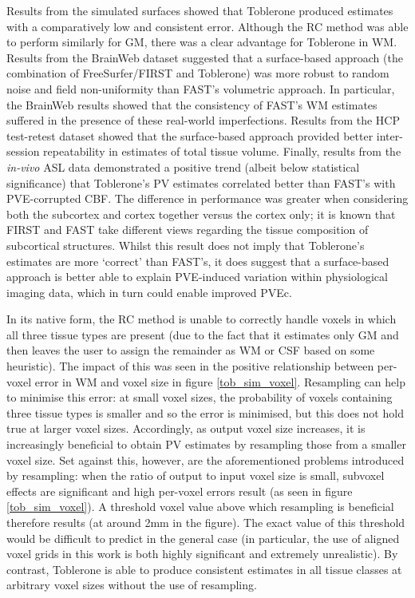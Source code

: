 Results from the simulated surfaces showed that Toblerone produced estimates with a comparatively low and consistent error. Although the RC method was able to perform similarly for GM, there was a clear advantage for Toblerone in WM. Results from the BrainWeb dataset suggested that a surface-based approach (the combination of FreeSurfer/FIRST and Toblerone) was more robust to random noise and field non-uniformity than FAST’s volumetric approach. In particular, the BrainWeb results showed that the consistency of FAST’s WM estimates suffered in the presence of these real-world imperfections. Results from the HCP test-retest dataset showed that the surface-based approach provided better inter-session repeatability in estimates of total tissue volume. Finally, results from the \textit{in-vivo} ASL data demonstrated a positive trend (albeit below statistical significance) that Toblerone's PV estimates correlated better than FAST's with PVE-corrupted CBF. The difference in performance was greater when considering both the subcortex and cortex together versus the cortex only; it is known that FIRST and FAST take different views regarding the tissue composition of subcortical structures. Whilst this result does not imply that Toblerone's estimates are more `correct' than FAST's, it does suggest that a surface-based approach is better able to explain PVE-induced variation within physiological imaging data, which in turn could enable improved PVEc. 

In its native form, the RC method is unable to correctly handle voxels in which all three tissue types are present (due to the fact that it estimates only GM and then leaves the user to assign the remainder as WM or CSF based on some heuristic). The impact of this was seen in the positive relationship between per-voxel error in WM and voxel size in figure \ref{tob_sim_voxel}. Resampling can help to minimise this error: at small voxel sizes, the probability of voxels containing three tissue types is smaller and so the error is minimised, but this does not hold true at larger voxel sizes. Accordingly, as output voxel size increases, it is increasingly beneficial to obtain PV estimates by resampling those from a smaller voxel size. Set against this, however, are the aforementioned problems introduced by resampling: when the ratio of output to input voxel size is small, subvoxel effects are significant and high per-voxel errors result (as seen in figure \ref{tob_sim_voxel}). A threshold voxel value above which resampling is beneficial therefore results (at around 2mm in the figure). The exact value of this threshold would be difficult to predict in the general case (in particular, the use of aligned voxel grids in this work is both highly significant and extremely unrealistic). By contrast, Toblerone is able to produce consistent estimates in all tissue classes at arbitrary voxel sizes without the use of resampling. 

